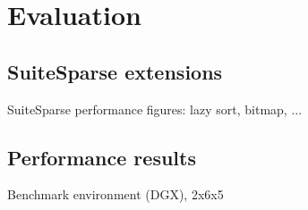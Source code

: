 \section{Evaluation}
\label{sec:evaluation}


\subsection{SuiteSparse extensions}

SuiteSparse performance figures: lazy sort, bitmap, ...

\subsection{Performance results}

Benchmark environment (DGX), 2x6x5
